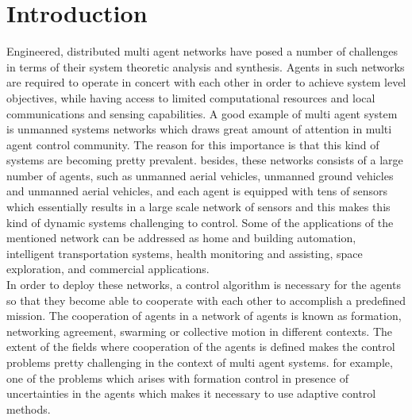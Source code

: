 \documentclass[conference]{IEEEtran}
\begin{document}
\section{Introduction}
Engineered, distributed multi agent networks have posed a number of challenges in terms of their system theoretic analysis and synthesis. Agents in such networks are required to operate in concert with each other in order to achieve system level objectives, while having access to limited computational resources and local communications and sensing capabilities.
A good example of multi agent system is unmanned systems networks which draws great amount of attention in multi agent control community. The reason for this importance is that this kind of systems are becoming pretty prevalent. besides, these networks consists of a large number of agents, such as unmanned aerial vehicles, unmanned ground vehicles and unmanned aerial vehicles, and each agent is equipped with tens of sensors which essentially results in a large scale network of sensors and this makes this kind of dynamic systems challenging to control. Some of the applications of the mentioned network can be addressed as home and building automation, intelligent transportation systems, health monitoring and assisting, space exploration, and commercial applications. \\

In order to deploy these networks, a control algorithm is necessary for the agents so that they become able to cooperate with each other to accomplish a predefined mission. The cooperation of agents in a network of agents is known as formation, networking agreement, swarming or collective motion in different contexts. The extent of the fields where cooperation of the agents is defined makes the control problems pretty challenging in the context of multi agent systems. for example, one of the problems which arises with formation control in presence of uncertainties in the agents which makes it necessary to use adaptive control methods.\\
\end{document}
